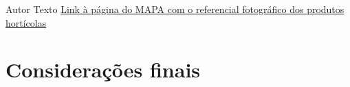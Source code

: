 \documentclass[
]{book}
\begin{document}
Autor
Texto
\href{https://www.gov.br/agricultura/pt-br/assuntos/inspecao/produtos-vegetal/arquivos/referencial-fotografico/referencial-fotografico}{Link à página do MAPA com o referencial fotográfico dos produtos hortícolas}

\hypertarget{considerauxe7uxf5es-finais}{%
\chapter{Considerações finais}\label{considerauxe7uxf5es-finais}}

  
\end{document}

